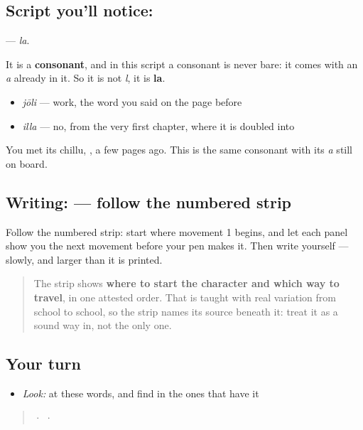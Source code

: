 \subsection*{Script you'll notice: }
\textbf{} — \emph{la}.

It is a \textbf{consonant}, and in this script a consonant is never bare: it comes with an \emph{a} already in it. So it is not \emph{l}, it is \textbf{la}.

\begin{itemize}
\raggedright
  \item \textbf{} \emph{jōli} — work, the word you said on the page before
  \item \textbf{} \emph{illa} — no, from the very first chapter, where it is doubled into \textbf{}
\end{itemize}

You met its chillu, \textbf{}, a few pages ago. This is the same consonant with its \emph{a} still on board.

\subsection*{Writing:  — follow the numbered strip}

Follow the numbered strip: start where movement 1 begins, and let each panel show you the next movement before your pen makes it. Then write  yourself — slowly, and larger than it is printed.

\begin{quote}
The strip shows \textbf{where to start the character and which way to travel}, in one attested order. That is taught with real variation from school to school, so the strip names its source beneath it: treat it as a sound way in, not the only one.
\end{quote}

\subsection*{Your turn}
\begin{itemize}
\raggedright
  \item \emph{Look:} at these words, and find  in the ones that have it
\end{itemize}

\begin{quote}
  ·    ·  
\end{quote}

